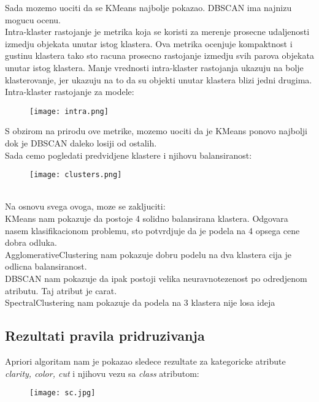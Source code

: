 \documentclass[10pt]{article}
\begin{document}
Sada mozemo uociti da se KMeans najbolje pokazao. DBSCAN ima najnizu mogucu ocenu.\\

Intra-klaster rastojanje je metrika koja se koristi za merenje prosecne udaljenosti izmedju objekata unutar istog klastera. Ova metrika ocenjuje kompaktnost i gustinu klastera tako sto racuna prosecno rastojanje izmedju svih parova objekata unutar istog klastera. Manje vrednosti intra-klaster rastojanja ukazuju na bolje klasterovanje, jer ukazuju na to da su objekti unutar klastera blizi jedni drugima. Intra-klaster rastojanje za modele:
\begin{figure}[h]
    \centering
    \texttt{[image: intra.png]}
    \label{Slika14}
\end{figure}

S obzirom na prirodu ove metrike, mozemo uociti da je KMeans ponovo najbolji dok je DBSCAN daleko losiji od ostalih.\\

Sada cemo pogledati predvidjene klastere i njihovu balansiranost:
\begin{figure}[h]
    \centering
    \texttt{[image: clusters.png]}
    \label{Slika15}
\end{figure}
\\

Na osnovu svega ovoga, moze se zakljuciti:\\
KMeans nam pokazuje da postoje 4 solidno balansirana klastera. Odgovara nasem klasifikacionom problemu, sto potvrdjuje da je podela na 4 opsega cene dobra odluka.\\
AgglomerativeClustering nam pokazuje dobru podelu na dva klastera cija je odlicna balansiranost.\\
DBSCAN nam pokazuje da ipak postoji velika neuravnotezenost po odredjenom atributu. Taj atribut je carat.\\
SpectralClustering nam pokazuje da podela na 3 klastera nije losa ideja\\


\subsection*{Rezultati pravila pridruzivanja}
Apriori algoritam nam je pokazao sledece rezultate za kategoricke atribute \textit{clarity, color, cut} i njihovu vezu sa \textit{class} atributom:
\begin{figure}[h]
    \centering
    \texttt{[image: sc.jpg]}
    \label{Slika16}
\end{figure}
\end{document}
